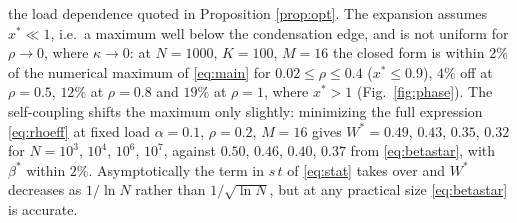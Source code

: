 \documentclass[11pt,a4paper]{article}
\begin{document}
the load dependence quoted in Proposition \ref{prop:opt}. The expansion assumes $x^*\ll1$, i.e.\ a maximum well below the condensation edge, and is not uniform for $\rho\to0$, where $\kappa\to0$: at $N=1000$, $K=100$, $M=16$ the closed form is within $2\%$ of the numerical maximum of \eqref{eq:main} for $0.02\le\rho\le0.4$ ($x^*\le0.9$), $4\%$ off at $\rho=0.5$, $12\%$ at $\rho=0.8$ and $19\%$ at $\rho=1$, where $x^*>1$ (Fig.\ \ref{fig:phase}). The self-coupling shifts the maximum only slightly: minimizing the full expression \eqref{eq:rhoeff} at fixed load $\alpha=0.1$, $\rho=0.2$, $M=16$ gives $W^*=0.49$, $0.43$, $0.35$, $0.32$ for $N=10^3$, $10^4$, $10^6$, $10^7$, against $0.50$, $0.46$, $0.40$, $0.37$ from \eqref{eq:betastar}, with $\beta^*$ within $2\%$. Asymptotically the term in $s\,t$ of \eqref{eq:stat} takes over and $W^*$ decreases as $1/\ln N$ rather than $1/\sqrt{\ln N}$, but at any practical size \eqref{eq:betastar} is accurate.
\end{document}

